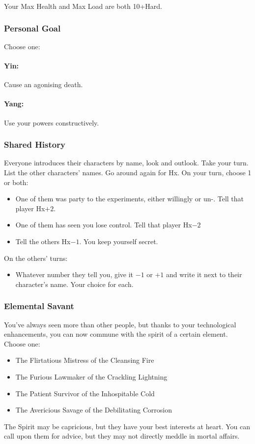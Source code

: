 Your Max Health and Max Load are both 10+Hard.

\subsubsection{Personal Goal}
Choose one:
\paragraph{Yin:} Cause an agonising death.
\paragraph{Yang:} Use your powers constructively.

\subsubsection{Shared History}
Everyone introduces their characters by name, look and outlook. Take
your turn. List the other characters' names. Go around again for
Hx. On your turn, choose 1 or both:
\begin{itemize} %
\item One of them was party to the experiments, either willingly or un-. Tell that player Hx$+2$.
\item One of them has seen you lose control. Tell that player Hx$-2$
\item Tell the others Hx$-1$. You keep yourself secret.
\end{itemize}
On the others’ turns:
\begin{itemize} %
\item Whatever number they tell you, give it $-1$ or $+1$ and write it
  next to their character’s name. Your choice for each.
\end{itemize}

\subsubsection{Elemental Savant}
You've always seen more than other people, but thanks to your technological enhancements, you can now commune with the spirit of a certain element. Choose one:
\begin{itemize}
\item The Flirtatious Mistress of the Cleansing Fire
\item The Furious Lawmaker of the Crackling Lightning
\item The Patient Survivor of the Inhospitable Cold
\item The Avericious Savage of the Debilitating Corrosion
\end{itemize}
The Spirit may be capricious, but they have your best interests at heart. You can call upon them for advice, but they may not directly meddle in mortal affairs.

